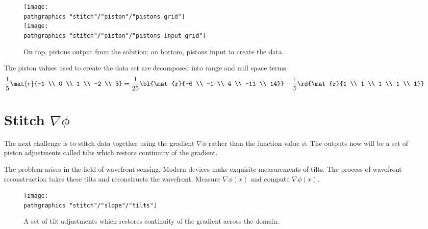 \begin{figure}[htbp] %
   \centering
   \texttt{[image: \\pathgraphics "stitch"/"piston"/"pistons grid"]} \\[10pt]
   \texttt{[image: \\pathgraphics "stitch"/"piston"/"pistons input grid"]} 
   \caption[Pistons from the solution and pistons used to create the data]{On top, pistons output from the solution; on bottom, pistons input to create the data.}
   \label{fig:pistons plus}
\end{figure}
The piston values used to create the data set are decomposed into range and null space terms.
  \begin{equation*}   %
    \frac{1}{5}\mat{r}{-1 \\ 0 \\ 1 \\ -2 \\ 3} = 
      \frac{1}{25}\bl{\mat{r}{-6 \\ -1 \\ 4 \\ -11 \\ 14}} -
      \frac{1}{5}\rd{\mat{r}{1 \\ 1 \\ 1 \\ 1 \\ 1}}
  \end{equation*}

\section{Stitch $\nabla \phi$}  %
The next challenge is to stitch data together using the gradient $\nabla \phi$ rather than the function value $\phi$. The outputs now will be a set of piston adjustments called tilts which restore continuity of the gradient.

The problem arises in the field of wavefront sensing. Modern devices make exquisite measurements of tilts.  
The process of wavefront reconstruction takes these tilts and reconstructs the wavefront. Measure $\nabla \phi(x)$ and compute $\nabla \phi(x)$.

\begin{figure}[htbp] %
   \centering
   \texttt{[image: \\pathgraphics "stitch"/"slope"/"tilts"]} 
   \caption{A set of tilt adjustments which restores continuity of the gradient across the domain.}
   \label{fig:tilts}
\end{figure}

